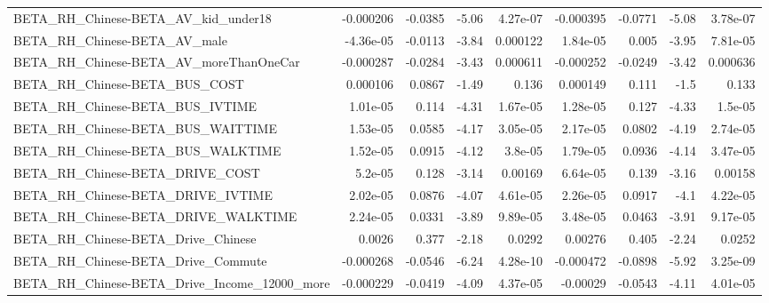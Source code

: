 \begin{tabular}{lrrrrrrrr}
BETA\_RH\_Chinese-BETA\_AV\_kid\_under18                &   -0.000206 &      -0.0385 &    -5.06 & 4.27e-07 &  -0.000395 &     -0.0771 &        -5.08 &      3.78e-07 \\
BETA\_RH\_Chinese-BETA\_AV\_male                       &   -4.36e-05 &      -0.0113 &    -3.84 & 0.000122 &   1.84e-05 &       0.005 &        -3.95 &      7.81e-05 \\
BETA\_RH\_Chinese-BETA\_AV\_moreThanOneCar             &   -0.000287 &      -0.0284 &    -3.43 & 0.000611 &  -0.000252 &     -0.0249 &        -3.42 &      0.000636 \\
BETA\_RH\_Chinese-BETA\_BUS\_COST                      &    0.000106 &       0.0867 &    -1.49 &    0.136 &   0.000149 &       0.111 &         -1.5 &         0.133 \\
BETA\_RH\_Chinese-BETA\_BUS\_IVTIME                    &    1.01e-05 &        0.114 &    -4.31 & 1.67e-05 &   1.28e-05 &       0.127 &        -4.33 &       1.5e-05 \\
BETA\_RH\_Chinese-BETA\_BUS\_WAITTIME                  &    1.53e-05 &       0.0585 &    -4.17 & 3.05e-05 &   2.17e-05 &      0.0802 &        -4.19 &      2.74e-05 \\
BETA\_RH\_Chinese-BETA\_BUS\_WALKTIME                  &    1.52e-05 &       0.0915 &    -4.12 &  3.8e-05 &   1.79e-05 &      0.0936 &        -4.14 &      3.47e-05 \\
BETA\_RH\_Chinese-BETA\_DRIVE\_COST                    &     5.2e-05 &        0.128 &    -3.14 &  0.00169 &   6.64e-05 &       0.139 &        -3.16 &       0.00158 \\
BETA\_RH\_Chinese-BETA\_DRIVE\_IVTIME                  &    2.02e-05 &       0.0876 &    -4.07 & 4.61e-05 &   2.26e-05 &      0.0917 &         -4.1 &      4.22e-05 \\
BETA\_RH\_Chinese-BETA\_DRIVE\_WALKTIME                &    2.24e-05 &       0.0331 &    -3.89 & 9.89e-05 &   3.48e-05 &      0.0463 &        -3.91 &      9.17e-05 \\
BETA\_RH\_Chinese-BETA\_Drive\_Chinese                 &      0.0026 &        0.377 &    -2.18 &   0.0292 &    0.00276 &       0.405 &        -2.24 &        0.0252 \\
BETA\_RH\_Chinese-BETA\_Drive\_Commute                 &   -0.000268 &      -0.0546 &    -6.24 & 4.28e-10 &  -0.000472 &     -0.0898 &        -5.92 &      3.25e-09 \\
BETA\_RH\_Chinese-BETA\_Drive\_Income\_12000\_more       &   -0.000229 &      -0.0419 &    -4.09 & 4.37e-05 &   -0.00029 &     -0.0543 &        -4.11 &      4.01e-05 \\

\end{tabular}
